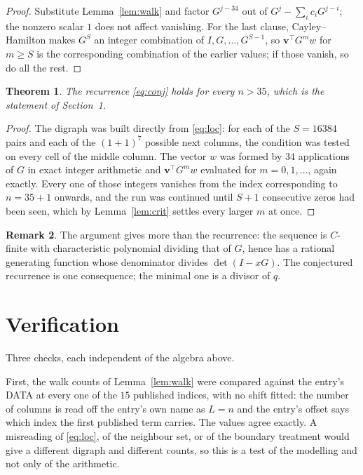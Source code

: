 \documentclass[11pt,a4paper]{article}
\theoremstyle{plain}
\newtheorem{theorem}{Theorem}
\theoremstyle{definition}
\newtheorem{remark}[theorem]{Remark}
\begin{document}
\begin{proof}
Substitute Lemma~\ref{lem:walk} and factor $G^{j-34}$ out of
$G^{j}-\sum_ic_iG^{j-i}$; the nonzero scalar $1$ does not affect
vanishing. For the last clause, Cayley--Hamilton makes $G^{S}$ an integer combination of
$I,G,\dots,G^{S-1}$, so $\mathbf{v}^{\!\top}G^{m}w$ for $m\ge S$ is the corresponding
combination of the earlier values; if those vanish, so do all the rest.
\end{proof}

\begin{theorem}
The recurrence \eqref{eq:conj} holds for every $n>35$, which is the statement of
Section~1.
\end{theorem}

\begin{proof}
The digraph was built directly from \eqref{eq:loc}: for each of the $S=16384$ pairs and each
of the $(1+1)^{7}$ possible next columns, the condition was tested on every cell of
the middle column. The vector $w$ was formed by $34$ applications of $G$ in exact integer
arithmetic and $\mathbf{v}^{\!\top}G^{m}w$ evaluated for $m=0,1,\dots$, again exactly.
Every one of those integers vanishes from the index corresponding to $n=35+1$ onwards,
and the run was continued until $S+1$ consecutive zeros had been seen, which by
Lemma~\ref{lem:crit} settles every larger $m$ at once.
\end{proof}

\begin{remark}
The argument gives more than the recurrence: the sequence is $C$-finite with characteristic
polynomial dividing that of $G$, hence has a rational generating function whose denominator
divides $\det(I-xG)$. The conjectured recurrence is one consequence; the minimal one is a
divisor of $q$.
\end{remark}

\section{Verification}

Three checks, each independent of the algebra above.

First, the walk counts of Lemma~\ref{lem:walk} were compared against the entry's DATA at
every one of the $15$ published indices, with no shift fitted: the number of columns is
read off the entry's own name as $L=n$ and the entry's offset says which index the first
published term carries. The values agree exactly. A misreading of \eqref{eq:loc}, of the
neighbour set, or of the boundary treatment would give a different digraph and different
counts, so this is a test of the modelling and not only of the arithmetic.
\end{document}
